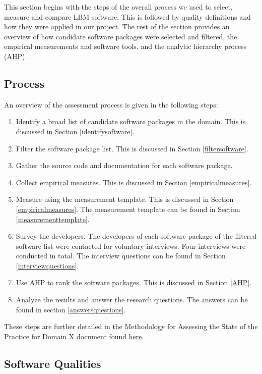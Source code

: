 \documentclass[12pt, notitlepage]{article}
\begin{document}
This section begins with the steps of the overall process we used to select, measure and compare LBM software. This is followed by quality definitions and how they were applied in our project. The rest of the section provides an overview of how candidate software packages were selected and filtered, the empirical measurements and software tools, and the analytic hierarchy process (AHP). 

\subsection{Process}

 An overview of the assessment process is given in the following steps: 

\begin{enumerate}
	\item Identify a broad list of candidate software packages in the domain. This is discussed in Section \ref{identifysoftware}.
	\item Filter the software package list. This is discussed in Section \ref{filtersoftware}.
	\item Gather the source code and documentation for each software package.
	\item Collect empirical measures. This is discussed in Section \ref{empiricalmeasures}.
	\item Measure using the measurement template. This is discussed in Section \ref{empiricalmeasures}. The measurement template can be found in Section \ref{measurementtemplate}.
	\item Survey the developers. The developers of each software package of the filtered software list were contacted for voluntary interviews. Four interviews were conducted in total. The interview questions can be found in Section \ref{interviewquestions}.
	\item Use AHP to rank the software packages. This is discussed in Section \ref{AHP}.
	\item Analyze the results and answer the research questions. The answers can be found in section \ref{answersquestions}.
\end{enumerate}

These steps are further detailed in the Methodology for Assessing the State of the Practice for Domain X document found \href{https://github.com/smiths/AIMSS/blob/master/StateOfPractice/Methodology/Methodology.pdf}{here}. 

\subsection{Software Qualities}\label{softwarequalities}
\end{document}
